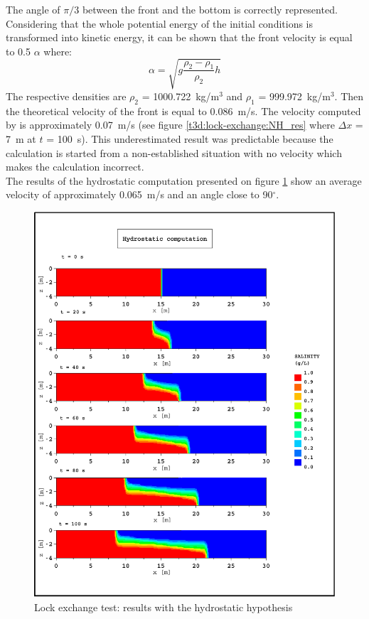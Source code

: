 The angle of $\pi/3$ between the front and the bottom is correctly
represented.\\
Considering that the whole potential energy of the initial conditions is
transformed into kinetic energy, it can be shown that the front velocity
is equal to 0.5 $\alpha$ where:
\begin{equation}
\alpha = \sqrt{g \frac{\rho_2-\rho_1}{\rho_2}h}
\end{equation}
The respective densities are $\rho_2$ = 1000.722~kg/m$^3$
and $\rho_1$ = 999.972~kg/m$^3$.
Then the theoretical velocity of the front is equal to 0.086~m/s.
The velocity computed by  is approximately 0.07~m/s
(see figure \ref{t3d:lock-exchange:NH_res} where $\Delta x$ = 7~m
at $t$ = 100~s).
This underestimated result was predictable because the calculation is
started from a non-established situation with no velocity which makes
the calculation incorrect.\\
The results of the hydrostatic computation presented on figure
\ref{t3d:lock-exchange:hydro_res} show an average velocity of
approximately 0.065~m/s and an angle close to 90$^\circ$.

\begin{figure} [h]
\centering
\includegraphics[scale=0.8]{../img/lock_exchange_hydro_res.pdf}
 \caption{Lock exchange test: results with the hydrostatic hypothesis}
 \label{t3d:lock-exchange:hydro_res}
\end{figure}

